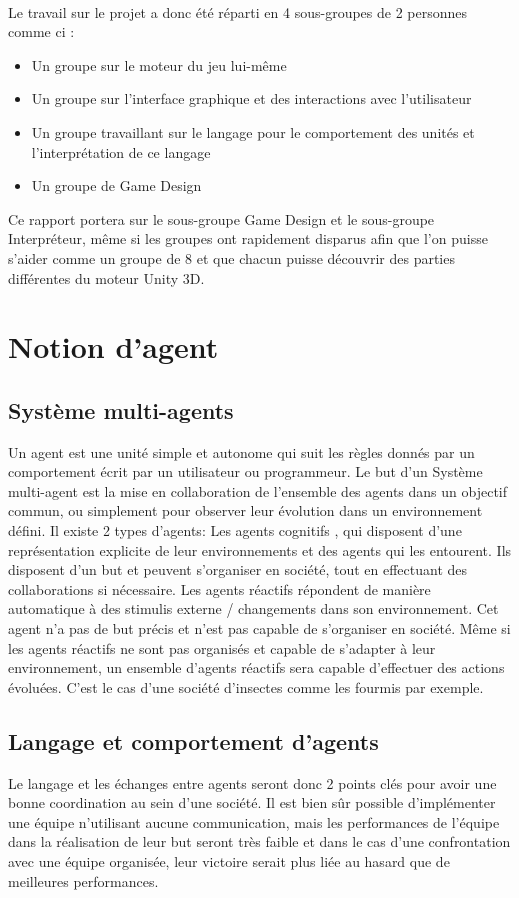 \documentclass{report}
\begin{document}
\paragraph{}
Le travail sur le projet a donc été réparti en 4 sous-groupes de 2 personnes comme ci : 
\begin{itemize}
\item Un groupe sur le moteur du jeu lui-même
\item Un groupe sur l’interface graphique et des interactions avec l’utilisateur
\item Un groupe travaillant sur le langage pour le comportement des unités et l’interprétation de ce langage
\item Un groupe de Game Design 
\end{itemize}

Ce rapport portera sur le sous-groupe Game Design et le sous-groupe Interpréteur, même si les groupes ont rapidement disparus afin que l’on puisse s’aider comme un groupe de 8 et que chacun puisse découvrir des parties différentes du moteur Unity 3D.
\section{Notion d'agent}
\subsection{Système multi-agents}
Un agent est une unité simple et autonome qui suit les règles donnés par un comportement  écrit par un utilisateur ou programmeur. 
Le but d’un Système multi-agent est la mise en collaboration de l’ensemble des agents dans un objectif commun, ou simplement pour observer leur évolution dans un environnement défini.
Il existe 2 types d’agents:
 Les agents cognitifs , qui disposent d’une représentation explicite de leur environnements et des agents qui les entourent. Ils disposent d’un but et peuvent s’organiser en société, tout en effectuant des collaborations si nécessaire.
Les agents réactifs répondent de manière automatique à des stimulis externe / changements dans son environnement. Cet agent n’a pas de but précis et n’est pas capable de s’organiser en société. 
Même si les agents réactifs ne sont pas organisés et capable de s’adapter à leur environnement, un ensemble d’agents réactifs sera capable d’effectuer des actions évoluées. C’est le cas d’une société d’insectes comme les fourmis par exemple. 


\subsection{Langage et comportement d’agents}
 Le langage et les échanges entre agents seront donc 2 points clés pour avoir une bonne coordination au sein d’une société.
Il est bien sûr possible d’implémenter une équipe n’utilisant aucune communication, mais les performances de l’équipe dans la réalisation de leur but seront très faible et dans le cas d’une confrontation avec une équipe organisée, leur victoire serait plus liée au hasard que de meilleures performances.
\end{document}
